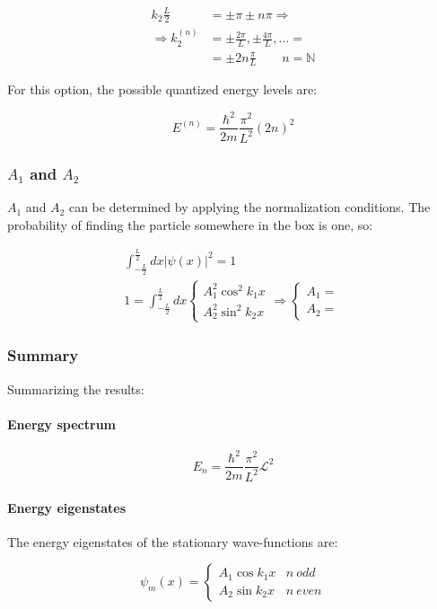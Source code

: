     \begin{align*}
      k_2 \frac{L}{2} &=\pm \pi\pm n\pi\Rightarrow\\
      \Rightarrow k_2^{(n)} &=\pm \frac{2\pi}{L},\pm \frac{4\pi}{L},\dots =\\
                            &= \pm 2n\frac{\pi}{L}\qquad n = \mathbb{N}
    \end{align*}

    For this option, the possible quantized energy levels are:

    $$E^{(n)} = \frac{\hbar^2}{2m}\frac{\pi^2}{L^2}(2n)^2$$

    \subsubsection{$A_1$ and $A_2$}
    $A_1$ and $A_2$ can be determined by applying the normalization conditions.
    The probability of finding the particle somewhere in the box is one, so:

    \begin{align*}
      \int_{-\frac{L}{2}}^{\frac{L}{2}} dx|\psi(x)|^2 = 1\\
      1 = \int_{-\frac{L}{2}}^{\frac{L}{2}} dx\begin{cases}A_1^2\cos^2k_1x\\A_2^2\sin^2 k_2x\end{cases}\Rightarrow\begin{cases}A_1 = \\A_2 = \end{cases}
    \end{align*}

    \subsubsection{Summary}
    Summarizing the results:

      \paragraph{Energy spectrum}

      $$E_n = \frac{\hbar^2}{2m}\frac{\pi^2}{L^2}\mathcal{L}^2$$

      \paragraph{Energy eigenstates}
      The energy eigenstates of the stationary wave-functions are:

      $$\psi_m(x) = \begin{cases}A_1\cos k_1 x & n\ odd\\ A_2\sin k_2 x & n\ even\end{cases}$$


